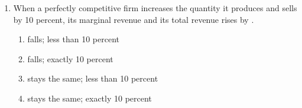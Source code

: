 \documentclass{article}
\begin{document}
\begin{enumerate}
\begin{enumerate}
		\end{enumerate}
		
	\item When a perfectly competitive firm increases the quantity it produces and sells by 10 percent, its marginal revenue \underline{\phantom{xxxxxxxxxx}} and its total revenue rises by \underline{\phantom{xxxxxxxxxx}}.
	
		\begin{enumerate}
		
		\item falls; less than 10 percent
		
		\item falls; exactly 10 percent
		
		\item stays the same; less than 10 percent
		
		\item stays the same; exactly 10 percent
		
		\end{enumerate}

\end{enumerate}
\end{document}
